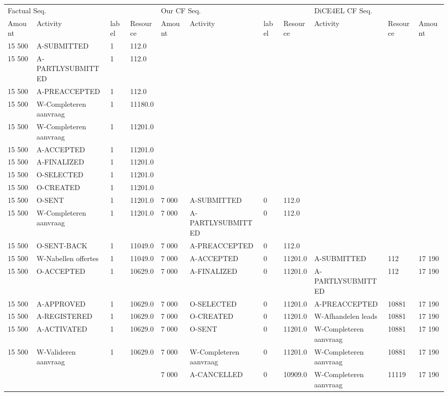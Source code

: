 \begin{tabular}{lllllllllll}
\toprule
\multicolumn{4}{l}{Factual Seq.} & \multicolumn{4}{l}{Our CF Seq.} & \multicolumn{3}{l}{DiCE4EL CF Seq.} \\
Amount & Activity & label & Resource & Amount & Activity & label & Resource & Activity & Resource & Amount \\
\midrule
15 500 & A-SUBMITTED & 1 & 112.0 &  &  &  &  &  &  &  \\
15 500 & A-PARTLYSUBMITTED & 1 & 112.0 &  &  &  &  &  &  &  \\
15 500 & A-PREACCEPTED & 1 & 112.0 &  &  &  &  &  &  &  \\
15 500 & W-Completeren aanvraag & 1 & 11180.0 &  &  &  &  &  &  &  \\
15 500 & W-Completeren aanvraag & 1 & 11201.0 &  &  &  &  &  &  &  \\
15 500 & A-ACCEPTED & 1 & 11201.0 &  &  &  &  &  &  &  \\
15 500 & A-FINALIZED & 1 & 11201.0 &  &  &  &  &  &  &  \\
15 500 & O-SELECTED & 1 & 11201.0 &  &  &  &  &  &  &  \\
15 500 & O-CREATED & 1 & 11201.0 &  &  &  &  &  &  &  \\
15 500 & O-SENT & 1 & 11201.0 & 7 000 & A-SUBMITTED & 0 & 112.0 &  &  &  \\
15 500 & W-Completeren aanvraag & 1 & 11201.0 & 7 000 & A-PARTLYSUBMITTED & 0 & 112.0 &  &  &  \\
15 500 & O-SENT-BACK & 1 & 11049.0 & 7 000 & A-PREACCEPTED & 0 & 112.0 &  &  &  \\
15 500 & W-Nabellen offertes & 1 & 11049.0 & 7 000 & A-ACCEPTED & 0 & 11201.0 & A-SUBMITTED & 112 & 17 190 \\
15 500 & O-ACCEPTED & 1 & 10629.0 & 7 000 & A-FINALIZED & 0 & 11201.0 & A-PARTLYSUBMITTED & 112 & 17 190 \\
15 500 & A-APPROVED & 1 & 10629.0 & 7 000 & O-SELECTED & 0 & 11201.0 & A-PREACCEPTED & 10881 & 17 190 \\
15 500 & A-REGISTERED & 1 & 10629.0 & 7 000 & O-CREATED & 0 & 11201.0 & W-Afhandelen leads & 10881 & 17 190 \\
15 500 & A-ACTIVATED & 1 & 10629.0 & 7 000 & O-SENT & 0 & 11201.0 & W-Completeren aanvraag & 10881 & 17 190 \\
15 500 & W-Valideren aanvraag & 1 & 10629.0 & 7 000 & W-Completeren aanvraag & 0 & 11201.0 & W-Completeren aanvraag & 10881 & 17 190 \\
 &  &  &  & 7 000 & A-CANCELLED & 0 & 10909.0 & W-Completeren aanvraag & 11119 & 17 190 \\
\bottomrule
\end{tabular}
